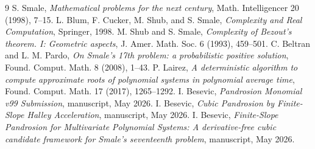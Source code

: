 \documentclass[11pt]{article}
\begin{document}
\begin{thebibliography}{9}
S. Smale, \emph{Mathematical problems for the next century}, Math. Intelligencer 20 (1998), 7--15.
L. Blum, F. Cucker, M. Shub, and S. Smale, \emph{Complexity and Real Computation}, Springer, 1998.
M. Shub and S. Smale, \emph{Complexity of Bezout's theorem. I: Geometric aspects}, J. Amer. Math. Soc. 6 (1993), 459--501.
C. Beltran and L. M. Pardo, \emph{On Smale's 17th problem: a probabilistic positive solution}, Found. Comput. Math. 8 (2008), 1--43.
P. Lairez, \emph{A deterministic algorithm to compute approximate roots of polynomial systems in polynomial average time}, Found. Comput. Math. 17 (2017), 1265--1292.
I. Besevic, \emph{Pandrosion Monomial v99 Submission}, manuscript, May 2026.
I. Besevic, \emph{Cubic Pandrosion by Finite-Slope Halley Acceleration}, manuscript, May 2026.
I. Besevic, \emph{Finite-Slope Pandrosion for Multivariate Polynomial Systems: A derivative-free cubic candidate framework for Smale's seventeenth problem}, manuscript, May 2026.
\end{thebibliography}
\end{document}
